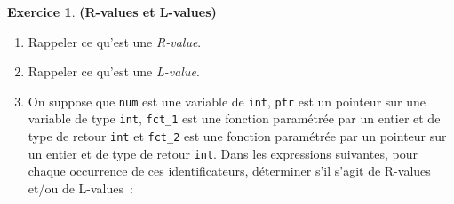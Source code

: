 \documentclass[12pt]{article}
\theoremstyle{definition}
\newtheorem{Exercice}{Exercice}
\begin{document}
\begin{Exercice} {\bf (R-values et L-values)}\smallskip
\begin{enumerate}
    \item Rappeler ce qu'est une {\em R-value}.
    \smallskip

    \item Rappeler ce qu'est une {\em L-value}.
    \smallskip

    \item On suppose que {\tt num} est une variable de {\tt int},
    {\tt ptr} est un pointeur sur une variable de type {\tt int},
    {\tt fct\_1} est une fonction paramétrée par un entier et de type
    de retour {\tt int} et {\tt fct\_2} est une fonction paramétrée par
    un pointeur sur un entier et de type de retour {\tt int}. Dans les
    expressions suivantes, pour chaque occurrence de ces identificateurs,
    déterminer s'il s'agit de R-values et/ou de L-values~:
    \begin{enumerate}[label = ({\alph*})]
    \end{enumerate}
\end{enumerate}
\end{Exercice}
\bigskip
\end{document}
